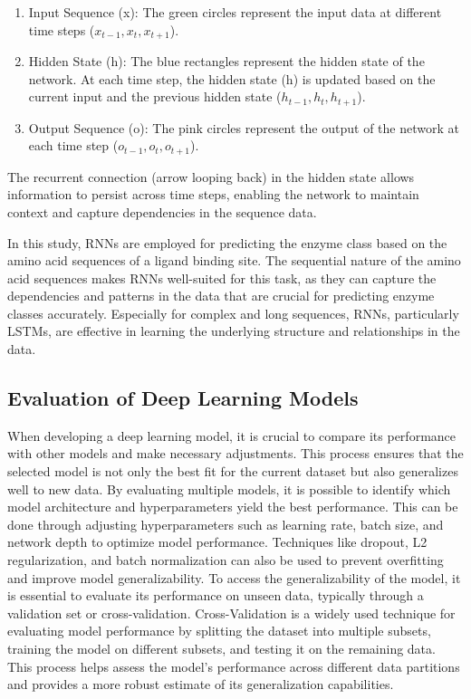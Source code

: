 \begin{enumerate}
    \item Input Sequence (x): The green circles represent the input data at different time steps ($ x_{t-1}, x_{t}, x_{t+1} $).
    \item Hidden State (h): The blue rectangles represent the hidden state of the network. At each time step, the hidden state (h) is updated based on the current input and the previous hidden state ($h_{t-1}, h_{t}, h_{t+1}$).
    \item Output Sequence (o): The pink circles represent the output of the network at each time step ($o_{t-1}, o_{t}, o_{t+1}$).
\end{enumerate}

The recurrent connection (arrow looping back) in the hidden state allows information to persist across time steps, enabling the network to maintain context and capture dependencies in the sequence data.

In this study, RNNs are employed for predicting the enzyme class based on the amino acid sequences of a ligand binding site. The sequential nature of the amino acid sequences makes RNNs well-suited for this task, as they can capture the dependencies and patterns in the data that are crucial for predicting enzyme classes accurately. Especially for complex and long sequences, RNNs, particularly LSTMs, are effective in learning the underlying structure and relationships in the data.

\subsection{Evaluation of Deep Learning Models}
\label{sec:Evaluation of Deep Learning Models}

When developing a deep learning model, it is crucial to compare its performance with other models and make necessary adjustments. This process ensures that the selected model is not only the best fit for the current dataset but also generalizes well to new data. By evaluating multiple models, it is possible to identify which model architecture and hyperparameters yield the best performance. This can be done through adjusting hyperparameters such as learning rate, batch size, and network depth to optimize model performance. Techniques like dropout, L2 regularization, and batch normalization can also be used to prevent overfitting and improve model generalizability. To access the generalizability of the model, it is essential to evaluate its performance on unseen data, typically through a validation set or cross-validation. Cross-Validation is a widely used technique for evaluating model performance by splitting the dataset into multiple subsets, training the model on different subsets, and testing it on the remaining data. This process helps assess the model's performance across different data partitions and provides a more robust estimate of its generalization capabilities.

